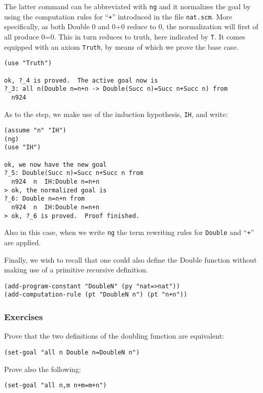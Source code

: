 \documentclass[12pt]{amsart}
\newcommand{\inquotes}[1]{``#1''}
\begin{document}
The latter command can be abbreviated with \texttt{ng} and it
normalizes the goal by using the computation rules for
\inquotes{\texttt{+}} introduced in the file \texttt{nat.scm}.  More
specifically, as both Double 0 and 0+0 reduce to 0, the normalization
will first of all produce 0=0.  This in turn reduces to truth, here
indicated by \texttt{T}.  It comes equipped with an axiom
\texttt{Truth}, by means of which we prove the base case.
\begin{verbatim}
(use "Truth")

ok, ?_4 is proved.  The active goal now is
?_3: all n(Double n=n+n -> Double(Succ n)=Succ n+Succ n) from
  n924
\end{verbatim}

As to the step, we make use of the induction hypothesis, \texttt{IH},
and write:
\begin{verbatim}
(assume "n" "IH")
(ng)
(use "IH")

ok, we now have the new goal
?_5: Double(Succ n)=Succ n+Succ n from
  n924  n  IH:Double n=n+n
> ok, the normalized goal is
?_6: Double n=n+n from
  n924  n  IH:Double n=n+n
> ok, ?_6 is proved.  Proof finished.
\end{verbatim}

Also in this case, when we write \texttt{ng} the term rewriting rules
for \texttt{Double} and \inquotes{\texttt{+}} are applied.

Finally, we wish to recall that one could also define the Double
function without making use of a primitive recursive definition.
\begin{verbatim}
(add-program-constant "DoubleN" (py "nat=>nat"))
(add-computation-rule (pt "DoubleN n") (pt "n+n"))
\end{verbatim}


\subsubsection{Exercises}
Prove that the two definitions of the doubling function are equivalent:
\begin{verbatim}
(set-goal "all n Double n=DoubleN n")
\end{verbatim}
Prove also the following:
\begin{verbatim}
(set-goal "all n,m n+m=m+n")
\end{verbatim}
\end{document}
